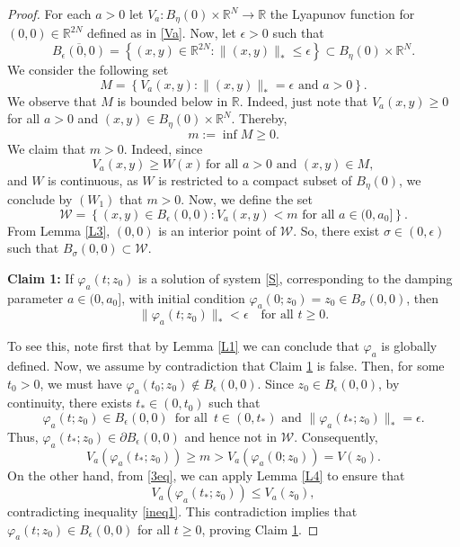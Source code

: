 \documentclass[10pt,a4paper]{amsart}
\begin{document}
\begin{proof}
For each $a>0$ let $V_a:B_\eta(0)\times \mathbb{R}^N\to \mathbb{R}$ the Lyapunov function for $(0,0) \in \mathbb{R}^{2N}$ defined as in \eqref{Va}. Now, let $\epsilon > 0$ such that
$$
\overline{B_\epsilon(0,0)} = \left\{ (x,y) \in \mathbb{R}^{2N} : \|(x,y)\|_* \leq \epsilon \right\} \subset B_\eta(0)\times \mathbb{R}^N.
$$
We consider the following set 
$$
M = \left\{ V_a(x,y) : \|(x,y)\|_* = \epsilon \text{ and } a>0 \right\}.
$$
We observe that $M$ is bounded below in $\mathbb{R}$. Indeed, just note that $V_a(x,y)\ge 0$ for all $a>0$ and $(x,y)\in B_\eta(0)\times \mathbb{R}^N$. Thereby, 
$$
m := \inf M \geq 0.
$$
We claim that $m > 0$. Indeed, since 
$$
V_a(x,y)\ge W(x)\,\text{for all } a>0\text{ and }(x,y)\in M,
$$
and $W$ is continuous, as $W$ is restricted to a compact subset of $B_\eta(0)$, we conclude by \hyperlink{W1}{$(W_1)$} that $m > 0$. Now, we define the set
$$
\mathcal{W}= \left\{ (x,y) \in B_\epsilon(0,0) : V_a(x,y) < m \text{ for all }a\in (0,a_0]\right\}.
$$
From Lemma \ref{L3}, $(0,0)$ is an interior point of $\mathcal{W}$. So, there exist $\sigma  \in (0, \epsilon)$ such that $B_\sigma(0,0) \subset \mathcal{W}$.
	
\noindent\textbf{\hypertarget{C1}{Claim 1:}} If $\varphi_a(t;z_0)$ is a solution of system \eqref{S}, corresponding to the damping parameter $a\in (0,a_0]$, with initial condition $ \varphi_a(0;z_0)=z_0\in B_\sigma (0,0)$, then
$$
\|\varphi_a(t;z_0)\|_* < \epsilon \quad \text{for all } t \geq 0.
$$

To see this, note first that by Lemma \ref{L1} we can conclude that $\varphi_a$ is globally defined. Now, we assume by contradiction that Claim \hyperlink{C1}{1} is false. Then, for some $t_{0} > 0$, we must have $\varphi_a(t_{0};z_0) \notin B_\epsilon(0,0)$. Since $z_0 \in B_\epsilon(0,0)$, by continuity, there exists $t_* \in (0, t_{0})$ such that
\begin{equation}\label{3eq}
	\varphi_a(t;z_0) \in B_\epsilon(0,0)\,\text{ for all } \, t \in (0, t_*)\text{ and }\|\varphi_a(t_*;z_0)\|_* = \epsilon.
\end{equation}
Thus, $\varphi_a(t_*;z_0) \in \partial B_\epsilon(0,0)$ and hence not in $\mathcal{W}$. Consequently,
\begin{equation}\label{ineq1}
	V_a(\varphi_a(t_*;z_0)) \geq m > V_a(\varphi_a(0;z_0))=V(z_0).
\end{equation}
On the other hand, from \eqref{3eq}, we can apply Lemma \ref{L4} to ensure that
$$
V_a(\varphi_a(t_*;z_0)) \leq V_a(z_0),
$$
contradicting inequality \eqref{ineq1}. This contradiction implies that $\varphi_a(t;z_0) \in B_\epsilon(0,0)$ for all $t \geq 0$, proving Claim \hyperlink{C1}{1}.
	

\end{proof}
\end{document}
